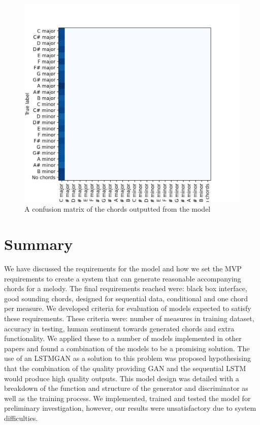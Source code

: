 \begin{figure}
    \centering
    \includegraphics[width=0.4\columnwidth]{Figures/confusion_real}
    \decoRule
    \caption{A confusion matrix of the chords outputted from the model}
    \label{fig:confusion_real}
\end{figure}

\section{Summary}

We have discussed the requirements for the model and how we set the MVP requirements to create a system that can generate reasonable accompanying chords for a melody.
The final requirements reached were: black box interface, good sounding chords, designed for sequential data, conditional and one chord per measure.
We developed criteria for evaluation of models expected to satisfy these requirements.
These criteria were: number of measures in training dataset, accuracy in testing, human sentiment towards generated chords and extra functionality.  
We applied these to a number of models implemented in other papers and found a combination of the models to be a promising solution. 
The use of an LSTMGAN as a solution to this problem was proposed hypothesising that the combination of the quality providing GAN and the sequential LSTM would produce high quality outputs.
This model design was detailed with a breakdown of the function and structure of the generator and discriminator as well as the training process.
We implemented, trained and tested the model for preliminary investigation, however, our results were unsatisfactory due to system difficulties.
